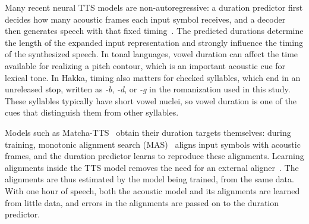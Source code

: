\documentclass[conference,a4paper]{IEEEtran}
\begin{document}
Many recent neural TTS models are non-autoregressive: a duration predictor first decides how many acoustic frames each input symbol receives, and a decoder then generates speech with that fixed timing~\cite{ren2021fastspeech2,mehta2024matcha}. The predicted durations determine the length of the expanded input representation and strongly influence the timing of the synthesized speech. In tonal languages, vowel duration can affect the time available for realizing a pitch contour, which is an important acoustic cue for lexical tone. In Hakka, timing also matters for checked syllables, which end in an unreleased stop, written as \textit{-b}, \textit{-d}, or \textit{-g} in the romanization used in this study. These syllables typically have short vowel nuclei, so vowel duration is one of the cues that distinguish them from other syllables.

Models such as Matcha-TTS~\cite{mehta2024matcha} obtain their duration targets themselves: during training, monotonic alignment search (MAS)~\cite{kim2020glow} aligns input symbols with acoustic frames, and the duration predictor learns to reproduce these alignments. Learning alignments inside the TTS model removes the need for an external aligner~\cite{kim2020glow,badlani2022one}. The alignments are thus estimated by the model being trained, from the same data. With one hour of speech, both the acoustic model and its alignments are learned from little data, and errors in the alignments are passed on to the duration predictor.
\end{document}
